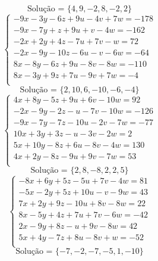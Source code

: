 \documentclass[12pt,oneside,a4paper]{article}
\begin{document}
\begin{equation*}
\text{Solução = }\{4,9,-2,8,-2,2\}
\end{equation*}
\vspace{\baselineskip}
\begin{equation*}
\begin{cases}
-9x-3y-6z+9u-4v+7w=-178 \\
-9x-7y+z+9u+v-4w=-162 \\
-2x+2y+4z-7u+7v-w=72 \\
-2x-9y-10z-6u-v-6w=-64 \\
8x-8y-6z+9u-8v-8w=-110 \\
8x-3y+9z+7u-9v+7w=-4 \\
\end{cases}
\end{equation*}
\begin{equation*}
\text{Solução = }\{2,10,6,-10,-6,-4\}
\end{equation*}
\vspace{\baselineskip}
\begin{equation*}
\begin{cases}
4x+8y-5z+9u+6v-10w=92 \\
-2x-9y-2z-u-7v-10w=-126 \\
-9x-7y-7z-10u-2v-7w=-77 \\
10x+3y+3z-u-3v-2w=2 \\
5x+10y-8z+6u-8v-4w=130 \\
4x+2y-8z-9u+9v-7w=53 \\
\end{cases}
\end{equation*}
\begin{equation*}
\text{Solução = }\{2,8,-8,2,2,5\}
\end{equation*}
\vspace{\baselineskip}
\begin{equation*}
\begin{cases}
-8x+6y+5z-5u+7v-4w=81 \\
-5x-2y+5z+10u-v-9w=43 \\
7x+2y+9z-10u+8v-8w=22 \\
8x-5y+4z+7u+7v-6w=-42 \\
2x-9y+8z-u+9v-8w=42 \\
5x+4y-7z+8u-8v+w=-52 \\
\end{cases}
\end{equation*}
\begin{equation*}
\text{Solução = }\{-7,-2,-7,-5,1,-10\}
\end{equation*}
\end{document}

